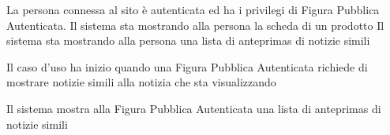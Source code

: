 
{}
{La persona connessa al sito è autenticata ed ha i privilegi di Figura Pubblica Autenticata. Il sistema sta mostrando alla persona la scheda di un prodotto}
{Il sistema sta mostrando alla persona una lista di \glspl{anteprima} di notizie simili}
{\begin{enumCU}
	\item Il caso d'uso ha inizio quando una Figura Pubblica Autenticata richiede di mostrare notizie simili alla notizia che sta visualizzando
	\item Il sistema mostra alla Figura Pubblica Autenticata una lista di \glspl{anteprima} di notizie simili
\end{enumCU}}


